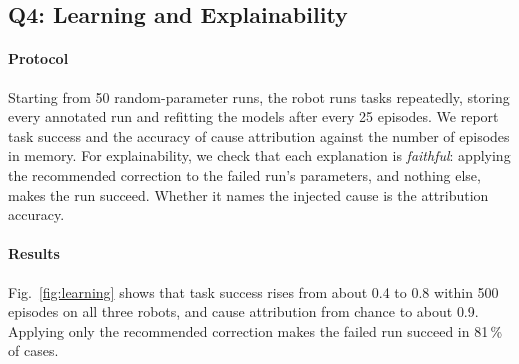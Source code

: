 \documentclass[letterpaper, 10 pt, conference]{ieeeconf}
\newcommand{\dummystyle}{\color{dummy}}
\newcommand{\dummystyle}{}
\newcommand{\dummy}[1]{{\dummystyle #1}}
\begin{document}
\subsection{Q4: Learning and Explainability}
\label{sec:exp-learning}

\paragraph*{Protocol}
Starting from \dummy{50} random-parameter runs, the robot runs tasks
repeatedly, storing every annotated run and refitting the models after every
\dummy{25} episodes. We report task success and the accuracy of cause
attribution against the number of episodes in memory. For explainability, we
check that each explanation is \emph{faithful}: applying the recommended
correction to the failed run's parameters, and nothing else, makes the run
succeed. Whether it names the injected cause is the attribution accuracy.

\paragraph*{Results}
Fig.~\ref{fig:learning} shows that task success rises from about \dummy{0.4}
to \dummy{0.8} within \dummy{500} episodes on all three robots, and cause
attribution from chance to about \dummy{0.9}. Applying only the recommended
correction makes the failed run succeed in \dummy{81}\,\% of cases.
\end{document}
